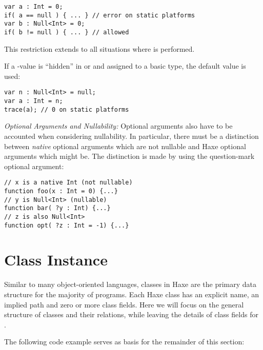 \documentclass{haxe}
\begin{document}
\begin{lstlisting}
var a : Int = 0;
if( a == null ) { ... } // error on static platforms
var b : Null<Int> = 0;
if( b != null ) { ... } // allowed
\end{lstlisting}
This restriction extends to all situations where  is performed.

If a -value is ``hidden'' in  or  and assigned to a basic type, the default value is used:

\begin{lstlisting}
var n : Null<Int> = null;
var a : Int = n;
trace(a); // 0 on static platforms
\end{lstlisting}

\emph{Optional Arguments and Nullability:}
Optional arguments also have to be accounted when considering nullability.
In particular, there must be a distinction between \emph{native} optional arguments which are not nullable and Haxe optional arguments which might be.  The distinction is made by using the question-mark optional argument:


\begin{lstlisting}
// x is a native Int (not nullable)
function foo(x : Int = 0) {...}
// y is Null<Int> (nullable)
function bar( ?y : Int) {...}
// z is also Null<Int>
function opt( ?z : Int = -1) {...}
\end{lstlisting}




\section{Class Instance}
\label{types-class-instance}

Similar to many object-oriented languages, classes in Haxe are the primary data structure for the majority of programs. Each Haxe class has an explicit name, an implied path and zero or more class fields. Here we will focus on the general structure of classes and their relations, while leaving the details of class fields for .

The following code example serves as basis for the remainder of this section:
\end{document}
